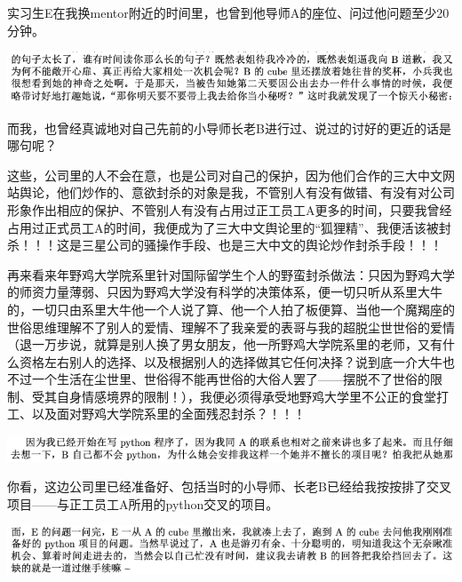\documentclass[9pt, b5paper]{article}
\begin{document}
实习生E在我换mentor附近的时间里，也曾到他导师A的座位、问过他问题至少20分钟。

\begin{center}
\includegraphics[width=.9\linewidth]{./pic/readme_20210508_140646.png}
\end{center}

而我，也曾经真诚地对自己先前的小导师长老B进行过、说过的讨好的更近的话是哪句呢？

这些，公司里的人不会在意，也是公司对自己的保护，因为他们合作的三大中文网站舆论，他们炒作的、意欲封杀的对象是我，不管别人有没有做错、有没有对公司形象作出相应的保护、不管别人有没有占用过正工员工A更多的时间，只要我曾经占用过正式员工A的时间，我便成为了三大中文舆论里的“狐狸精”、我便活该被封杀！！！这是三星公司的骚操作手段、也是三大中文的舆论炒作封杀手段！！！

再来看来年野鸡大学院系里针对国际留学生个人的野蛮封杀做法：只因为野鸡大学的师资力量薄弱、只因为野鸡大学没有科学的决策体系，便一切只听从系里大牛的，一切只由系里大牛他一个人说了算、他一个人拍了板便算、当他一个魔羯座的世俗思维理解不了别人的爱情、理解不了我亲爱的表哥与我的超脱尘世世俗的爱情（退一万步说，就算是别人换了男女朋友，他一所野鸡大学院系里的老师，又有什么资格左右别人的选择、以及根据别人的选择做其它任何决择？说到底一介大牛也不过一个生活在尘世里、世俗得不能再世俗的大俗人罢了——摆脱不了世俗的限制、受其自身情感境界的限制！），我便必须得承受地野鸡大学里不公正的食堂打工、以及面对野鸡大学院系里的全面残忍封杀？！！！

\begin{center}
\includegraphics[width=.9\linewidth]{./pic/backups_plans_20210508_115440.png}
\end{center}

你看，这边公司里已经准备好、包括当时的小导师、长老B已经给我按按排了交叉项目——与正工员工A所用的python交叉的项目。

\begin{center}
\includegraphics[width=.9\linewidth]{./pic/backups_plans_20210508_115511.png}
\end{center}
\end{document}
